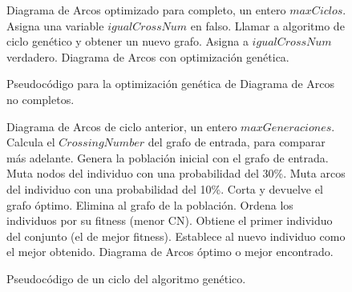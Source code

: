 	\begin{figure}	
	    \begin{center}
		\begin{algorithmic}[1]
			\REQUIRE Diagrama de Arcos optimizado para completo, un entero $maxCiclos$.
			\STATE Asigna una variable $igualCrossNum$ en falso.
			\STATE Llamar a algoritmo de ciclo genético y obtener un nuevo grafo.
			\STATE Asigna a $igualCrossNum$ verdadero.
			\ENDIF
			\ENDWHILE
			\ENSURE Diagrama de Arcos con optimización genética.
		\end{algorithmic}
	    \end{center}

		\caption{Pseudocódigo para la optimización genética de Diagrama de Arcos no completos.}
		\label{alg:genetico}
	\end{figure}
		\begin{figure}
	    \begin{center}
		\begin{algorithmic}[1]
			\REQUIRE Diagrama de Arcos de ciclo anterior, un entero $maxGeneraciones$.
			\STATE Calcula el $CrossingNumber$ del grafo de entrada, para comparar más adelante.
			\STATE Genera la población inicial con el grafo de entrada.
			\STATE Muta nodos del individuo con una probabilidad del 30\%.
			\STATE Muta arcos del individuo con una probabilidad del 10\%.
			\STATE Corta y devuelve el grafo óptimo.
			\ELSE
			\STATE Elimina al grafo de la población.
			\ENDIF
			\ENDIF
			\ENDFOR
			\STATE Ordena los individuos por su fitness (menor CN).
			\STATE Obtiene el primer individuo del conjunto (el de mejor fitness).
			\STATE Establece al nuevo individuo como el mejor obtenido.
			\ENDIF
			\ENDIF
			\ENDWHILE
			\ENSURE Diagrama de Arcos óptimo o mejor encontrado.
		\end{algorithmic}
	    \end{center}
		\caption{Pseudocódigo de un ciclo del algoritmo genético.}
		\label{alg:genetico_ciclo}
	\end{figure}
	
